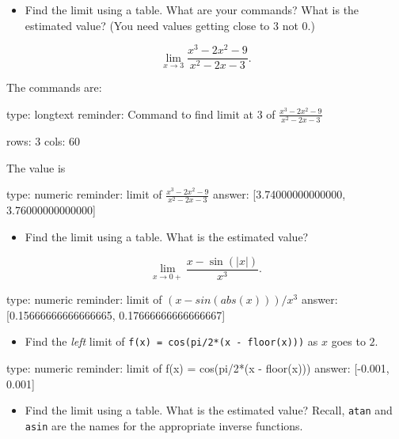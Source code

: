 \documentclass[12pt]{article}
\begin{document}
\begin{itemize}
\itemsep1pt\parskip0pt
\item
  Find the limit using a table. What are your commands? What is the
  estimated value? (You need values getting close to $3$ not $0$.)
\end{itemize}

\[
\lim_{x \rightarrow 3} \frac{x^3 - 2x^2 -9}{x^2 - 2x -3}.
\]

The commands are:

\begin{answer}
type: longtext
reminder: Command to find limit at 3 of \( \frac{x^3 - 2x^2 -9}{x^2 - 2x -3} \)

rows: 3
cols: 60
\end{answer}

The value is

\begin{answer}
    type: numeric
    reminder: limit of \( \frac{x^3 - 2x^2 -9}{x^2 - 2x -3} \)
    answer: [3.74000000000000, 3.76000000000000]

\end{answer}

\begin{itemize}
\itemsep1pt\parskip0pt
\item
  Find the limit using a table. What is the estimated value?
\end{itemize}

\[
\lim_{x \rightarrow 0+} \frac{x - \sin(\vert x\vert )}{x^3}.
\]

\begin{answer}
    type: numeric
    reminder: limit of \( (x - sin(abs(x)))/x^3 \)
    answer: [0.15666666666666665, 0.17666666666666667]

\end{answer}

\begin{itemize}
\itemsep1pt\parskip0pt
\item
  Find the \emph{left} limit of \texttt{f(x) = cos(pi/2*(x - floor(x)))}
  as $x$ goes to $2$.
\end{itemize}

\begin{answer}
    type: numeric
    reminder: limit of f(x) = cos(pi/2*(x - floor(x)))
    answer: [-0.001, 0.001]

\end{answer}

\begin{itemize}
\itemsep1pt\parskip0pt
\item
  Find the limit using a table. What is the estimated value? Recall,
  \texttt{atan} and \texttt{asin} are the names for the appropriate
  inverse functions.
\end{itemize}
\end{document}
